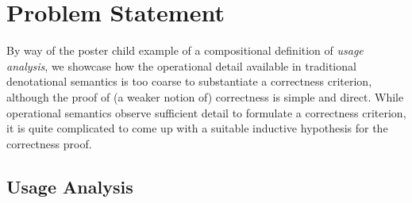 \section{Problem Statement}
\label{sec:problem}

By way of the poster child example of a compositional definition of \emph{usage
analysis}, we showcase how the operational detail available in traditional
denotational semantics is too coarse to substantiate a correctness criterion,
although the proof of (a weaker notion of) correctness is simple and direct.
While operational semantics observe sufficient detail to formulate a correctness
criterion, it is quite complicated to come up with a suitable inductive
hypothesis for the correctness proof.

%
%

\subsection{Usage Analysis}

